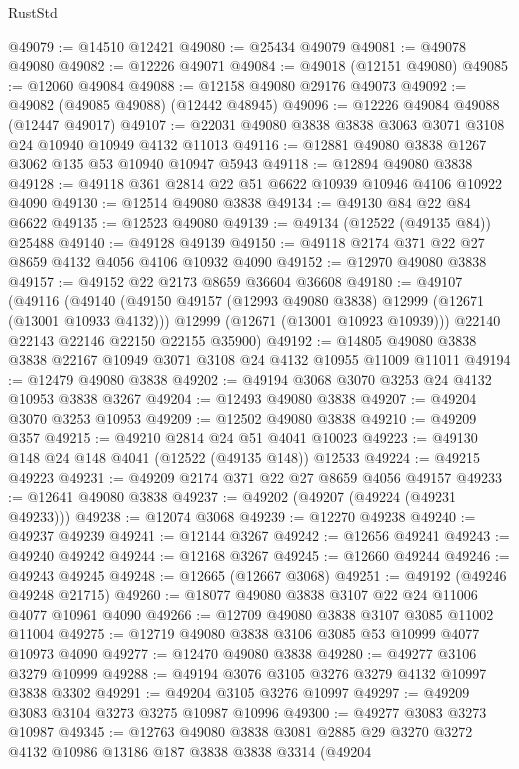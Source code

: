 \begin{lexlean}{RustStd}
\begin{coremodule}
@49079 := @14510 @12421
@49080 := @25434 @49079
@49081 := @49078 @49080
@49082 := @12226 @49071
@49084 := @49018 (@12151 @49080)
@49085 := @12060 @49084
@49088 := @12158 @49080 @29176 @49073
@49092 := @49082 (@49085 @49088) (@12442 @48945)
@49096 := @12226 @49084 @49088 (@12447 @49017)
@49107 := @22031 @49080 @3838 @3838 @3063 @3071 @3108 @24 @10940 @10949 @4132 @11013
@49116 := @12881 @49080 @3838 @1267 @3062 @135 @53 @10940 @10947 @5943
@49118 := @12894 @49080 @3838
@49128 := @49118 @361 @2814 @22 @51 @6622 @10939 @10946 @4106 @10922 @4090
@49130 := @12514 @49080 @3838
@49134 := @49130 @84 @22 @84 @6622
@49135 := @12523 @49080
@49139 := @49134 (@12522 (@49135 @84)) @25488
@49140 := @49128 @49139
@49150 := @49118 @2174 @371 @22 @27 @8659 @4132 @4056 @4106 @10932 @4090
@49152 := @12970 @49080 @3838
@49157 := @49152 @22 @2173 @8659 @36604 @36608
@49180 := @49107
    (@49116
      (@49140
        (@49150 @49157 (@12993 @49080 @3838) @12999 (@12671 (@13001 @10933 @4132)))
        @12999
        (@12671 (@13001 @10923 @10939)))
      @22140
      @22143
      @22146
      @22150
      @22155
      @35900)
@49192 := @14805 @49080 @3838 @3838 @22167 @10949 @3071 @3108 @24 @4132 @10955 @11009 @11011
@49194 := @12479 @49080 @3838
@49202 := @49194 @3068 @3070 @3253 @24 @4132 @10953 @3838 @3267
@49204 := @12493 @49080 @3838
@49207 := @49204 @3070 @3253 @10953
@49209 := @12502 @49080 @3838
@49210 := @49209 @357
@49215 := @49210 @2814 @24 @51 @4041 @10023
@49223 := @49130 @148 @24 @148 @4041 (@12522 (@49135 @148)) @12533
@49224 := @49215 @49223
@49231 := @49209 @2174 @371 @22 @27 @8659 @4056 @49157
@49233 := @12641 @49080 @3838
@49237 := @49202 (@49207 (@49224 (@49231 @49233)))
@49238 := @12074 @3068
@49239 := @12270 @49238
@49240 := @49237 @49239
@49241 := @12144 @3267
@49242 := @12656 @49241
@49243 := @49240 @49242
@49244 := @12168 @3267
@49245 := @12660 @49244
@49246 := @49243 @49245
@49248 := @12665 (@12667 @3068)
@49251 := @49192 (@49246 @49248 @21715)
@49260 := @18077 @49080 @3838 @3107 @22 @24 @11006 @4077 @10961 @4090
@49266 := @12709 @49080 @3838 @3107 @3085 @11002 @11004
@49275 := @12719 @49080 @3838 @3106 @3085 @53 @10999 @4077 @10973 @4090
@49277 := @12470 @49080 @3838
@49280 := @49277 @3106 @3279 @10999
@49288 := @49194 @3076 @3105 @3276 @3279 @4132 @10997 @3838 @3302
@49291 := @49204 @3105 @3276 @10997
@49297 := @49209 @3083 @3104 @3273 @3275 @10987 @10996
@49300 := @49277 @3083 @3273 @10987
@49345 := @12763
    @49080
    @3838
    @3081
    @2885
    @29
    @3270
    @3272
    @4132
    @10986
    @13186
    @187
    @3838
    @3838
    @3314
    (@49204

\end{coremodule}
\end{lexlean}
